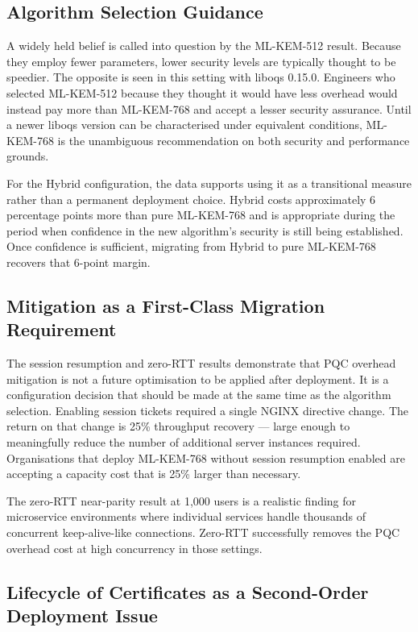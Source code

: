 \documentclass[conference]{IEEEtran}
\begin{document}
\subsection{Algorithm Selection Guidance}

A widely held belief is called into question by the ML-KEM-512 result. Because they employ fewer parameters, lower security levels are typically thought to be speedier. The opposite is seen in this setting with liboqs 0.15.0. Engineers who selected ML-KEM-512 because they thought it would have less overhead would instead pay more than ML-KEM-768 and accept a lesser security assurance. Until a newer liboqs version
can be characterised under equivalent conditions, ML-KEM-768 is the unambiguous
recommendation on both security and performance grounds.

For the Hybrid configuration, the data supports using it as a transitional measure rather
than a permanent deployment choice. Hybrid costs approximately 6 percentage points more
than pure ML-KEM-768 and is appropriate during the period when confidence in the new
algorithm's security is still being established. Once confidence is sufficient, migrating
from Hybrid to pure ML-KEM-768 recovers that 6-point margin.

\subsection{Mitigation as a First-Class Migration Requirement}

The session resumption and zero-RTT results demonstrate that PQC overhead mitigation is
not a future optimisation to be applied after deployment. It is a configuration decision
that should be made at the same time as the algorithm selection. Enabling session tickets
required a single NGINX directive change. The return on that change is 25\% throughput
recovery --- large enough to meaningfully reduce the number of additional server instances
required. Organisations that deploy ML-KEM-768 without session resumption enabled are
accepting a capacity cost that is 25\% larger than necessary.

The zero-RTT near-parity result at 1,000 users is a realistic finding for microservice
environments where individual services handle thousands of concurrent keep-alive-like
connections. Zero-RTT successfully removes the PQC overhead cost at high concurrency in those settings.

\subsection{Lifecycle of Certificates as a Second-Order Deployment Issue}
\end{document}
